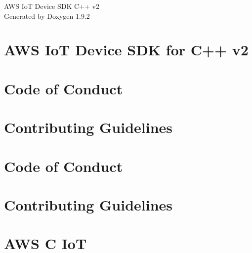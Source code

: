 \documentclass[twoside]{book}
\newcommand{\+}{\discretionary{\mbox{\scriptsize$\hookleftarrow$}}{}{}}
\newcommand{\clearemptydoublepage}{%
    \newpage{\pagestyle{empty}\cleardoublepage}%
  }
\begin{document}
  \raggedbottom
    \hypersetup{pageanchor=false,
                bookmarksnumbered=true,
                pdfencoding=unicode
               }
  \begin{titlepage}
  \vspace*{7cm}
  \begin{center}%
  {\Large AWS Io\+T Device SDK C++ v2}\\
  \vspace*{1cm}
  {\large Generated by Doxygen 1.9.2}\\
  \end{center}
  \end{titlepage}
  \clearemptydoublepage
  \tableofcontents
  \clearemptydoublepage
  \hypersetup{pageanchor=true}
\chapter{AWS IoT Device SDK for C++ v2}
\label{index}\hypertarget{index}{}
\chapter{Code of Conduct}
\label{md__c_o_d_e__o_f__c_o_n_d_u_c_t}

\chapter{Contributing Guidelines}
\label{md__c_o_n_t_r_i_b_u_t_i_n_g}

\chapter{Code of Conduct}
\label{md_crt_aws_c_iot__c_o_d_e__o_f__c_o_n_d_u_c_t}

\chapter{Contributing Guidelines}
\label{md_crt_aws_c_iot__c_o_n_t_r_i_b_u_t_i_n_g}

\chapter{AWS C IoT}
\label{md_crt_aws_c_iot__r_e_a_d_m_e}

\end{document}
